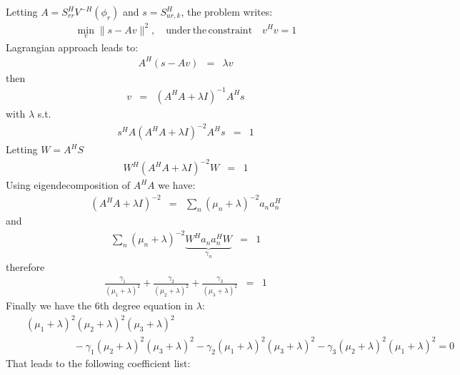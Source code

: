 \documentclass[a4paper, 12pt]{report}
\begin{document}
Letting $A=S_{rr}^{H}V^{-H}(\phi_{r})$ and $s=S_{ur,k}^{H}$, the problem writes:
\begin{eqnarray*}
\min_{v} \| s - Av\|^{2}, \quad \mathrm{under\,the\,constraint}\quad v^{H}v=1
 \end{eqnarray*}
Lagrangian approach leads to:
\begin{eqnarray*}
A^{H}(s-Av)&=&\lambda v
\end{eqnarray*}
then
\begin{eqnarray*}
v&=&
(A^{H}A+\lambda I)^{-1}A^{H}s
\end{eqnarray*}
with $\lambda$ s.t.
\begin{eqnarray*}
s^{H}A(A^{H}A+\lambda I)^{-2}A^{H}s&=&1
\end{eqnarray*}
Letting $W=A^{H}S$
\begin{eqnarray*}
W^{H}(A^{H}A+\lambda I)^{-2}W&=&1
\end{eqnarray*}
Using eigendecomposition of $A^{H}A$ we have:
\begin{eqnarray*}
(A^{H}A+\lambda I)^{-2}&=&\sum_{n}(\mu_{n}+\lambda)^{-2} a_{n}a_{n}^{H}
\end{eqnarray*}
and 
\begin{eqnarray*}
\sum_{n}(\mu_{n}+\lambda)^{-2} \underbrace{W^{H}a_{n}a_{n}^{H}W}_{\gamma_{n}}&=&1
\end{eqnarray*}
therefore
\begin{eqnarray*}
\frac{\gamma_{1}}{(\mu_{1}+\lambda)^{2}}
+\frac{\gamma_{2}}{(\mu_{2}+\lambda)^{2}}
+\frac{\gamma_{3}}{(\mu_{3}+\lambda)^{2}}&=&1
\end{eqnarray*}
Finally we have the 6th degree equation in $\lambda$:
\begin{eqnarray*}
&&(\mu_{1}+\lambda)^{2}(\mu_{2}+\lambda)^{2}(\mu_{3}+\lambda)^{2}
\\
&&\hspace{2cm}
-\gamma_{1}(\mu_{2}+\lambda)^{2}(\mu_{3}+\lambda)^{2}
-\gamma_{2}(\mu_{1}+\lambda)^{2}(\mu_{3}+\lambda)^{2}
-\gamma_{3}(\mu_{2}+\lambda)^{2}(\mu_{1}+\lambda)^{2}
= 0
\end{eqnarray*}
That leads to the following coefficient list:
\end{document}
